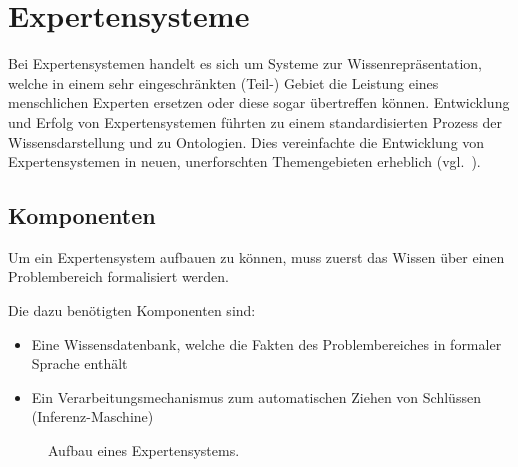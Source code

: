 \chapter{Expertensysteme}
\label{chap:experten_systeme}

Bei Expertensystemen handelt es sich um Systeme zur Wissenrepräsentation, welche in einem sehr eingeschränkten (Teil-) Gebiet die Leistung eines menschlichen Experten ersetzen  oder diese sogar übertreffen können. Entwicklung und Erfolg von Expertensystemen führten zu einem standardisierten Prozess der Wissensdarstellung und zu Ontologien. Dies vereinfachte die Entwicklung von Expertensystemen in neuen, unerforschten Themengebieten erheblich (vgl.~\cite[S. 257]{russel}).

\section{Komponenten}
\label{sec:experten_systeme_komponenten}
Um ein Expertensystem aufbauen zu können, muss zuerst das Wissen über einen Problembereich formalisiert werden.

Die dazu benötigten Komponenten sind:
\begin{itemize}
    \item Eine Wissensdatenbank, welche die Fakten des Problembereiches in formaler Sprache enthält
    \item Ein Verarbeitungsmechanismus zum automatischen Ziehen von Schlüssen (Inferenz-Maschine)
\end{itemize}

\begin{figure}[htbp]
\centering {}
\caption{Aufbau eines Expertensystems.\label{fig:aufbau_expertensysteme}\protect\footnotemark}
\end{figure}

